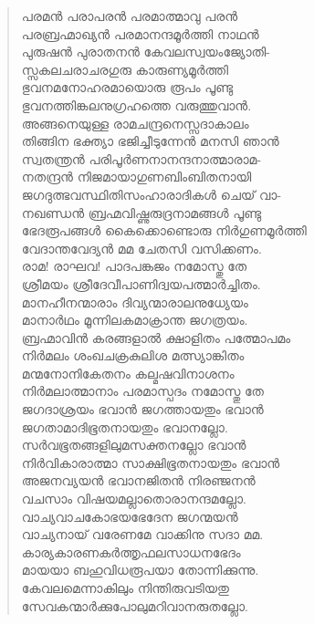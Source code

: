 \begin{verse}
പരമന്‍ പരാപരന്‍ പരമാത്മാവു പരന്‍\\
പരബ്രഹ്മാഖ്യന്‍ പരമാനന്ദമൂര്‍ത്തി നാഥന്‍\\
പുരുഷന്‍ പുരാതനന്‍ കേവലസ്വയംജ്യോതി-\\
സ്സകലചരാചരഗുരു കാരുണ്യമൂര്‍ത്തി\\
ഭുവനമനോഹരമായൊരു രൂപം പൂണ്ടു\\
ഭുവനത്തിങ്കലനുഗ്രഹത്തെ വരുത്തുവാന്‍.\\
അങ്ങനെയുള്ള രാമചന്ദ്രനെസ്സദാകാലം\\
തിങ്ങിന ഭക്ത്യാ ഭജിച്ചീടുന്നേന്‍ മനസി ഞാന്‍\\
സ്വതന്ത്രന്‍ പരിപൂര്‍ണനാനന്ദനാത്മാരാമ-\\
നതന്ദ്രന്‍ നിജമായാഗുണബിംബിതനായി\\
ജഗദുത്ഭവസ്ഥിതിസംഹാരാദികള്‍ ചെയ് വാ-\\
നഖണ്ഡന്‍ ബ്രഹ്മവിഷ്ണുരുദ്രനാമങ്ങള്‍ പൂണ്ടു\\
ഭേദരൂപങ്ങള്‍ കൈക്കൊണ്ടൊരു നിര്‍ഗുണമൂര്‍ത്തി\\
വേദാന്തവേദ്യന്‍ മമ ചേതസി വസിക്കണം.\\
രാമ! രാഘവ! പാദപങ്കജം നമോസ്തു തേ\\
ശ്രീമയം ശ്രീദേവീപാണിദ്വയപത്മാര്‍ച്ചിതം.\\
മാനഹീനന്മാരാം ദിവ്യന്മാരാലനുധ്യേയം\\
മാനാര്‍ഥം മൂന്നിലകമാക്രാന്ത ജഗത്രയം.\\
ബ്രഹ്മാവിന്‍ കരങ്ങളാല്‍ ക്ഷാളിതം പത്മോപമം\\
നിര്‍മലം ശംഖചക്രകുലിശ മത്സ്യാങ്കിതം\\
മന്മനോനികേതനം കല്മഷവിനാശനം\\
നിര്‍മലാത്മാനാം പരമാസ്പദം നമോസ്തു തേ\\
ജഗദാശ്രയം ഭവാന്‍ ജഗത്തായതും ഭവാന്‍\\
ജഗതാമാദിഭൂതനായതും ഭവാനല്ലോ.\\
സര്‍വഭൂതങ്ങളിലുമസക്തനല്ലോ ഭവാന്‍\\
നിര്‍വികാരാത്മാ സാക്ഷിഭൂതനായതും ഭവാന്‍\\
അജനവ്യയന്‍ ഭവാനജിതന്‍ നിരഞ്ജനന്‍\\
വചസാം വിഷയമല്ലാതൊരാനന്ദമല്ലോ.\\
വാച്യവാചകോഭയഭേദേന ജഗന്മയന്‍\\
വാച്യനായ് വരേണമേ വാക്കിനു സദാ മമ.\\
കാര്യകാരണകര്‍ത്തൃഫലസാധനഭേദം\\
മായയാ ബഹുവിധരൂപയാ തോന്നിക്കുന്നു.\\
കേവലമെന്നാകിലും നിന്തിരുവടിയതു\\
സേവകന്മാര്‍ക്കുപോലുമറിവാനരുതല്ലോ.\\

\end{verse}
